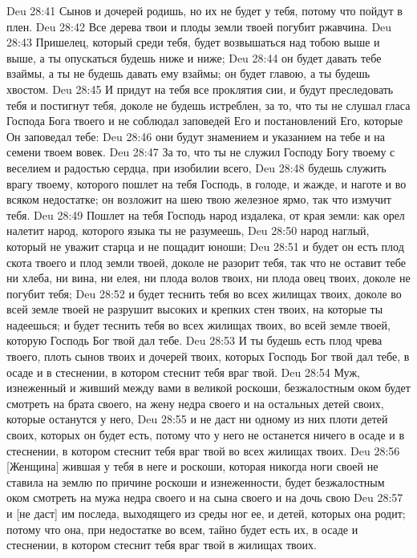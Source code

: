 Deu 28:41  Сынов и дочерей родишь, но их не будет у тебя, потому что пойдут в плен.
Deu 28:42  Все дерева твои и плоды земли твоей погубит ржавчина.
Deu 28:43  Пришелец, который среди тебя, будет возвышаться над тобою выше и выше, а ты опускаться будешь ниже и ниже;
Deu 28:44  он будет давать тебе взаймы, а ты не будешь давать ему взаймы; он будет главою, а ты будешь хвостом.
Deu 28:45  И придут на тебя все проклятия сии, и будут преследовать тебя и постигнут тебя, доколе не будешь истреблен, за то, что ты не слушал гласа Господа Бога твоего и не соблюдал заповедей Его и постановлений Его, которые Он заповедал тебе:
Deu 28:46  они будут знамением и указанием на тебе и на семени твоем вовек.
Deu 28:47  За то, что ты не служил Господу Богу твоему с веселием и радостью сердца, при изобилии всего,
Deu 28:48  будешь служить врагу твоему, которого пошлет на тебя Господь, в голоде, и жажде, и наготе и во всяком недостатке; он возложит на шею твою железное ярмо, так что измучит тебя.
Deu 28:49  Пошлет на тебя Господь народ издалека, от края земли: как орел налетит народ, которого языка ты не разумеешь,
Deu 28:50  народ наглый, который не уважит старца и не пощадит юноши;
Deu 28:51  и будет он есть плод скота твоего и плод земли твоей, доколе не разорит тебя, так что не оставит тебе ни хлеба, ни вина, ни елея, ни плода волов твоих, ни плода овец твоих, доколе не погубит тебя;
Deu 28:52  и будет теснить тебя во всех жилищах твоих, доколе во всей земле твоей не разрушит высоких и крепких стен твоих, на которые ты надеешься; и будет теснить тебя во всех жилищах твоих, во всей земле твоей, которую Господь Бог твой дал тебе.
Deu 28:53  И ты будешь есть плод чрева твоего, плоть сынов твоих и дочерей твоих, которых Господь Бог твой дал тебе, в осаде и в стеснении, в котором стеснит тебя враг твой.
Deu 28:54  Муж, изнеженный и живший между вами в великой роскоши, безжалостным оком будет смотреть на брата своего, на жену недра своего и на остальных детей своих, которые останутся у него,
Deu 28:55  и не даст ни одному из них плоти детей своих, которых он будет есть, потому что у него не останется ничего в осаде и в стеснении, в котором стеснит тебя враг твой во всех жилищах твоих.
Deu 28:56  [Женщина] жившая у тебя в неге и роскоши, которая никогда ноги своей не ставила на землю по причине роскоши и изнеженности, будет безжалостным оком смотреть на мужа недра своего и на сына своего и на дочь свою
Deu 28:57  и [не даст] им последа, выходящего из среды ног ее, и детей, которых она родит; потому что она, при недостатке во всем, тайно будет есть их, в осаде и стеснении, в котором стеснит тебя враг твой в жилищах твоих.
